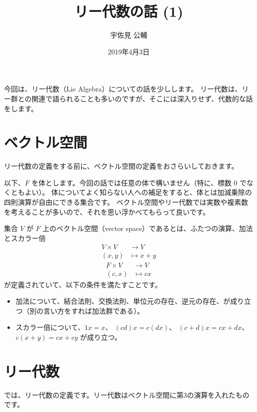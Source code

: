 \documentclass{ltjsarticle}
\title{リー代数の話 (1)}
\author{宇佐見 公輔}
\date{2019年4月3日}
\begin{document}
\maketitle

今回は、リー代数（Lie Algebra）についての話を少しします。
リー代数は、リー群との関連で語られることも多いのですが、そこには深入りせず、代数的な話をします。

\section{ベクトル空間}

リー代数の定義をする前に、ベクトル空間の定義をおさらいしておきます。

以下、\(F\) を体とします。今回の話では任意の体で構いません（特に、標数 \(0\) でなくともよい）。
体についてよく知らない人への補足をすると、体とは加減乗除の四則演算が自由にできる集合です。
ベクトル空間やリー代数では実数や複素数を考えることが多いので、それを思い浮かべてもらって良いです。

\begin{definition}[ベクトル空間]
    集合 \(V\) が \(F\) 上のベクトル空間（vector space）であるとは、ふたつの演算、加法とスカラー倍
    \begin{align*}
        V \times V & \to V         \\
        (x, y)     & \mapsto x + y
    \end{align*}
    \begin{align*}
        F \times V & \to V      \\
        (c, x)     & \mapsto cx
    \end{align*}
    が定義されていて、以下の条件を満たすことです。
    \begin{itemize}
        \item 加法について、結合法則、交換法則、単位元の存在、逆元の存在、が成り立つ（別の言い方をすれば加法群である）。
        \item スカラー倍について、\(1x = x\)、 \((cd)x = c(dx)\)、 \((c + d)x = cx + dx\)、 \(c(x + y) = cx + cy\)
              が成り立つ。
    \end{itemize}
\end{definition}

\section{リー代数}

では、リー代数の定義です。リー代数はベクトル空間に第3の演算を入れたものです。
\end{document}
